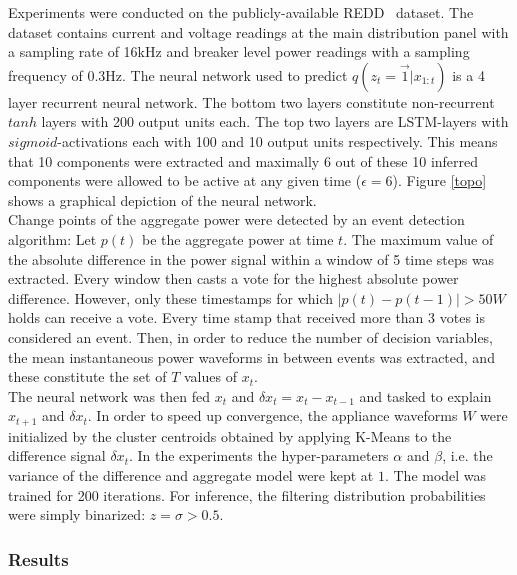 Experiments were conducted on the publicly-available REDD~\cite{kolter2011redd} dataset. The dataset contains current and voltage readings at the main distribution panel with a sampling rate of 16kHz and breaker level power readings with a sampling frequency of 0.3Hz. The neural network used to predict $q(z_t = \vec{1}|x_{1:t})$ is a 4 layer recurrent neural network. The bottom two layers constitute non-recurrent $tanh$ layers with 200 output units each. The top two layers are LSTM-layers with $sigmoid$-activations each with 100 and 10 output units respectively. This means that 10 components were extracted and maximally 6 out of these 10 inferred components were allowed to be active at any given time ($\epsilon = 6$). Figure \ref{topo} shows a graphical depiction of the neural network.\\
Change points of the aggregate power were detected by an event detection algorithm: Let $p(t)$ be the aggregate power at time $t$. The maximum value of the absolute difference in the power signal within a window of 5 time steps was extracted. Every window then casts a vote for the highest absolute power difference. However, only these timestamps for which $|p(t) - p(t-1)| > 50W$ holds can receive a vote. Every time stamp that received more than 3 votes is considered an event. Then, in order to reduce the number of decision variables, the mean instantaneous power waveforms in between events was extracted, and these constitute the set of $T$ values of $x_t$.\\
The neural network was then fed $x_t$ and $\delta x_t = x_t - x_{t-1}$ and tasked to explain $x_{t+1}$ and $\delta x_t$. In order to speed up convergence, the appliance waveforms $W$ were initialized by the cluster centroids obtained by applying K-Means to the difference signal $\delta x_t$. In the experiments the hyper-parameters $\alpha$ and $\beta$, i.e. the variance of the difference and aggregate model were kept at $1$. The model was trained for 200 iterations. For inference, the filtering distribution probabilities were simply binarized: $z = \sigma > 0.5$.



\subsubsection{Results}

